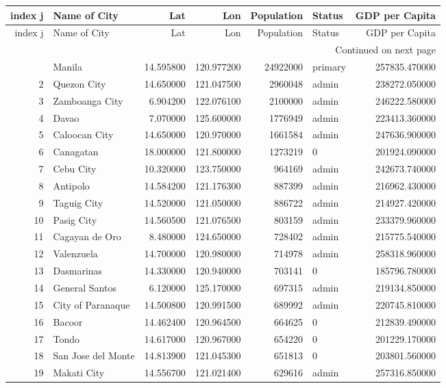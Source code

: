 \begin{longtable}{rlrrrlr}
\toprule
index j & Name of City & Lat & Lon & Population & Status & GDP per Capita \\
\midrule
\endfirsthead
\toprule
index j & Name of City & Lat & Lon & Population & Status & GDP per Capita \\
\midrule
\endhead
\midrule
\multicolumn{7}{r}{Continued on next page} \\
\midrule
\endfoot
\bottomrule
\endlastfoot
1 & Manila & 14.595800 & 120.977200 & 24922000 & primary & 257835.470000 \\
2 & Quezon City & 14.650000 & 121.047500 & 2960048 & admin & 238272.050000 \\
3 & Zamboanga City & 6.904200 & 122.076100 & 2100000 & admin & 246222.580000 \\
4 & Davao & 7.070000 & 125.600000 & 1776949 & admin & 223413.360000 \\
5 & Caloocan City & 14.650000 & 120.970000 & 1661584 & admin & 247636.900000 \\
6 & Canagatan & 18.000000 & 121.800000 & 1273219 & 0 & 201924.090000 \\
7 & Cebu City & 10.320000 & 123.750000 & 964169 & admin & 242673.740000 \\
8 & Antipolo & 14.584200 & 121.176300 & 887399 & admin & 216962.430000 \\
9 & Taguig City & 14.520000 & 121.050000 & 886722 & admin & 214927.420000 \\
10 & Pasig City & 14.560500 & 121.076500 & 803159 & admin & 233379.960000 \\
11 & Cagayan de Oro & 8.480000 & 124.650000 & 728402 & admin & 215775.540000 \\
12 & Valenzuela & 14.700000 & 120.980000 & 714978 & admin & 258318.960000 \\
13 & Dasmarinas & 14.330000 & 120.940000 & 703141 & 0 & 185796.780000 \\
14 & General Santos & 6.120000 & 125.170000 & 697315 & admin & 219134.850000 \\
15 & City of Paranaque & 14.500800 & 120.991500 & 689992 & admin & 220745.810000 \\
16 & Bacoor & 14.462400 & 120.964500 & 664625 & 0 & 212839.490000 \\
17 & Tondo & 14.617000 & 120.967000 & 654220 & 0 & 201229.170000 \\
18 & San Jose del Monte & 14.813900 & 121.045300 & 651813 & 0 & 203801.560000 \\
19 & Makati City & 14.556700 & 121.021400 & 629616 & admin & 257316.850000 \\

\end{longtable}
